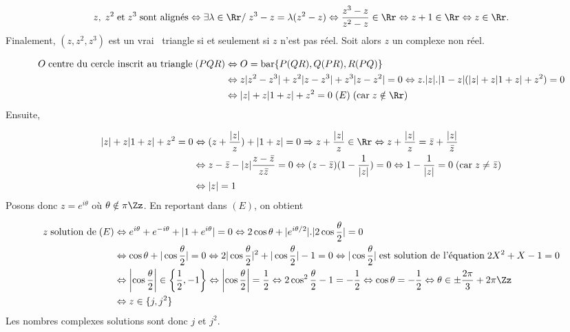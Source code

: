 {\begin{enumerate}
{$$z,\;z^2\;\mbox{et}\;z^3\;\mbox{sont
alignés}\Leftrightarrow\exists\lambda\in\Rr/\;z^3-z=\lambda(z^2-z)\Leftrightarrow\frac{z^3-z}{z^2-z}\in\Rr\Leftrightarrow z+1\in\Rr\Leftrightarrow z\in\Rr.$$
Finalement, $(z,z^2,z^3)$ est un \og vrai \fg~triangle si et seulement si $z$ n'est pas réel.
Soit alors $z$ un complexe non réel.

\begin{align*}
O\;\mbox{centre du cercle inscrit au triangle}\;(PQR)&\Leftrightarrow O=\mbox{bar}\{P(QR),Q(PR),R(PQ)\}\\
 &\Leftrightarrow z|z^2-z^3|+z^2|z-z^3|+z^3|z-z^2|=0
\Leftrightarrow z.|z|.|1-z|(|z|+z|1+z|+z^2)=0\\
 &\Leftrightarrow|z|+z|1+z|+z^2=0\;(E)\;(\mbox{car}\;z\notin\Rr)
\end{align*}
Ensuite,

\begin{align*}
|z|+z|1+z|+z^2=0&\Leftrightarrow(z+\frac{|z|}{z})+|1+z|=0\Rightarrow z+\frac{|z|}{z}\in\Rr\Leftrightarrow
z+\frac{|z|}{z}={\bar z}+\frac{|z|}{{\bar z}}\\
 &\Leftrightarrow z-{\bar z}-|z|\frac{z-{\bar z}}{z{\bar z}}=0\Leftrightarrow(z-{\bar z})(1-\frac{1}{|z|})=0
\Leftrightarrow1-\frac{1}{|z|}=0\;(\mbox{car}\;z\neq{\bar z})\\
 &\Leftrightarrow|z|= 1
\end{align*}
Posons donc $z=e^{i\theta}$ où $\theta\notin\pi\Zz$. En reportant dans $(E)$, on obtient

\begin{align*}
z\;\mbox{solution de}\;(E)&\Leftrightarrow e^{i\theta}+e^{-i\theta}+|1+e^{i\theta}|=
0\Leftrightarrow2\cos\theta+|e^{i\theta/2}|.|2\cos\frac{\theta}{2}|=0\\
 &\Leftrightarrow\cos\theta+|\cos\frac{\theta}{2}|=0\Leftrightarrow2|\cos\frac{\theta}{2}|^2+|\cos\frac{\theta}{2}|-1=0
\Leftrightarrow|\cos\frac{\theta}{2}|\;\text{est solution de l'équation}\;2X^2+X-1=0\\
 &\Leftrightarrow\left|\cos\frac{\theta}{2}\right|\in\left\{\frac{1}{2},-1\right\}\Leftrightarrow\left|\cos\frac{\theta}{2}\right|=\frac{1}{2}
\Leftrightarrow2\cos^2\frac{\theta}{2}-1=-\frac{1}{2}
\Leftrightarrow\cos\theta=-\frac{1}{2}\Leftrightarrow\theta\in\pm\frac{2\pi}{3}+2\pi\Zz\\
 &\Leftrightarrow
z\in\{j,j^2\}
\end{align*}
Les nombres complexes solutions sont donc $j$ et $j^2$.}
\end{enumerate}
}